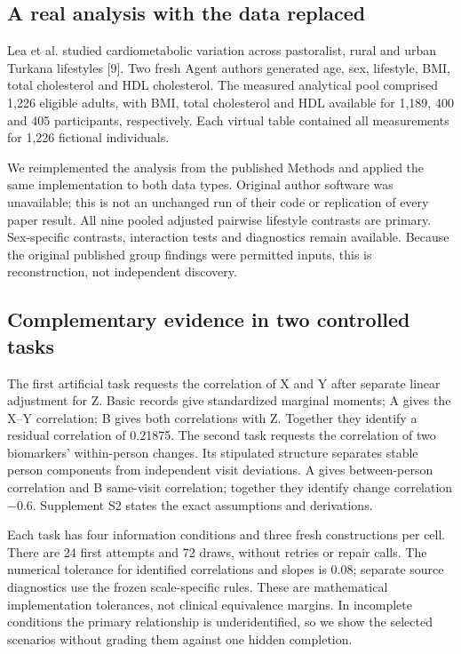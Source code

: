 \documentclass[11pt,letterpaper]{article}
\begin{document}
\endgroup

\FloatBarrier


\subsection{A real analysis with the data replaced}

Lea et al. studied cardiometabolic variation across pastoralist, rural and urban Turkana lifestyles [9]. Two fresh Agent authors generated age, sex, lifestyle, BMI, total cholesterol and HDL cholesterol. The measured analytical pool comprised 1,226 eligible adults, with BMI, total cholesterol and HDL available for 1,189, 400 and 405 participants, respectively. Each virtual table contained all measurements for 1,226 fictional individuals.


We reimplemented the analysis from the published Methods and applied the same implementation to both data types. Original author software was unavailable; this is not an unchanged run of their code or replication of every paper result. All nine pooled adjusted pairwise lifestyle contrasts are primary. Sex-specific contrasts, interaction tests and diagnostics remain available. Because the original published group findings were permitted inputs, this is reconstruction, not independent discovery.


\FloatBarrier


\subsection{Complementary evidence in two controlled tasks}

The first artificial task requests the correlation of X and Y after separate linear adjustment for Z. Basic records give standardized marginal moments; A gives the X–\allowbreak{}Y correlation; B gives both correlations with Z. Together they identify a residual correlation of 0.21875. The second task requests the correlation of two biomarkers' within-person changes. Its stipulated structure separates stable person components from independent visit deviations. A gives between-person correlation and B same-visit correlation; together they identify change correlation −0.6. Supplement S2 states the exact assumptions and derivations.


Each task has four information conditions and three fresh constructions per cell. There are 24 first attempts and 72 draws, without retries or repair calls. The numerical tolerance for identified correlations and slopes is 0.08; separate source diagnostics use the frozen scale-specific rules. These are mathematical implementation tolerances, not clinical equivalence margins. In incomplete conditions the primary relationship is underidentified, so we show the selected scenarios without grading them against one hidden completion.
\end{document}
